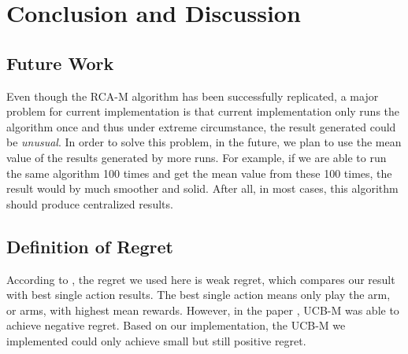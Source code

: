 \documentclass{article}
\begin{document}
\section{Conclusion and Discussion}

\subsection{Future Work}
Even though the RCA-M algorithm has been successfully replicated, a major problem for current implementation is that current implementation only runs the algorithm once and thus under extreme circumstance, the result generated could be \textit{unusual}. In order to solve this problem, in the future, we plan to use the mean value of the results generated by more runs. For example, if we are able to run the same algorithm 100 times and get the mean value from these 100 times, the result would by much smoother and solid. After all, in most cases, this algorithm should produce centralized results.

\subsection{Definition of Regret}
According to \cite{6200864}, the regret we used here is weak regret, which compares our result with best single action results. The best single action means only play the arm, or arms, with highest mean rewards. However, in the paper \cite{6200864}, UCB-M was able to achieve negative regret. Based on our implementation, the UCB-M we implemented could only achieve small but still positive regret.





\end{document}
